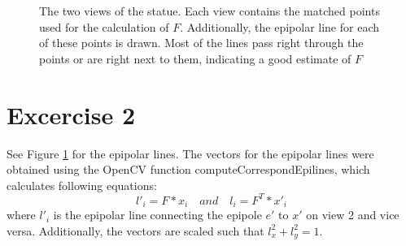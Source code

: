 \documentclass[11pt,a4paper]{article}
\begin{document}
\begin{figure}

\caption{The two views of the statue. Each view contains the matched points used for the calculation of $F$. Additionally, the epipolar line for each of these points is drawn. Most of the lines pass right through the points or are right next to them, indicating a good estimate of $F$}%
\label{fig:2}
\end{figure}


\section{Excercise 2}
See Figure \ref{fig:2} for the epipolar lines. The vectors for the epipolar lines were obtained using the OpenCV function computeCorrespondEpilines, which calculates following equations:
\begin{equation}
l'_{i}=F*x_{i} \quad and \quad l_{i}=F^{T}*x'_{i}
\label{eq:2}
\end{equation}
where $l'_{i}$ is the epipolar line connecting the epipole $e'$ to $x'$ on view 2 and vice versa. Additionally, the vectors are scaled such that $l_{x}^{2}+l_{y}^{2} = 1$.
\end{document}
